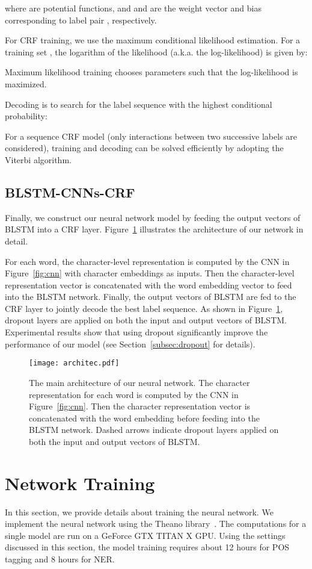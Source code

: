 \documentclass[11pt]{article}
\begin{document}
where  are potential functions, and  and  are the weight vector and bias corresponding to label pair , respectively.

For CRF training, we use the maximum conditional likelihood estimation. For a training set 
, the logarithm of the likelihood (a.k.a. the log-likelihood) 
is given by:

Maximum likelihood training chooses parameters such that the log-likelihood  is maximized.

Decoding is to search for the label sequence  with the highest conditional probability:

For a sequence CRF model (only interactions between two successive labels are considered), training and decoding can be solved efficiently by adopting the Viterbi algorithm.

\subsection{BLSTM-CNNs-CRF}
Finally, we construct our neural network model by feeding the output vectors of BLSTM into a CRF layer. Figure~\ref{fig:architec} illustrates the architecture of our network in detail.

For each word, the character-level representation is computed by the CNN in Figure~\ref{fig:cnn} with character embeddings as inputs. Then the character-level representation vector is concatenated with the word embedding vector to feed into the BLSTM network. Finally, the output vectors of BLSTM are fed to the CRF layer to jointly decode the best label sequence. As shown in Figure~\ref{fig:architec}, dropout layers are applied on both the input and output vectors of BLSTM. Experimental results show that using dropout significantly improve the performance of our model (see Section~\ref{subsec:dropout} for details).

\begin{figure}[t]
\centering
\texttt{[image: architec.pdf]}
\caption{The main architecture of our neural network. The character representation for each word is computed by the CNN in Figure~\ref{fig:cnn}. Then the character representation vector is concatenated with the word embedding before feeding into the BLSTM network. Dashed arrows indicate dropout layers applied on both the input and output vectors of BLSTM.}
\label{fig:architec}
\end{figure}

\section{Network Training}
In this section, we provide details about training the neural network. We implement the neural network using the Theano library~\cite{bergstra2010theano}. The computations for a single model are run on a GeForce GTX TITAN X GPU. Using the settings discussed in this section, the model training requires about 12 hours for POS tagging and 8 hours for NER.
\end{document}
